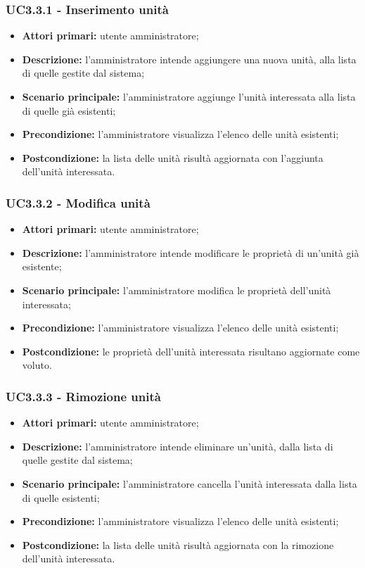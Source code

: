 \subsubsection{UC3.3.1 - Inserimento unità}
\begin{itemize}
	\item \textbf{Attori primari:} utente amministratore;
	\item \textbf{Descrizione:} l'amministratore intende aggiungere una nuova unità, alla lista di quelle gestite dal sistema;
	\item \textbf{Scenario principale:} l'amministratore aggiunge l'unità interessata alla lista di quelle già esistenti;
	\item \textbf{Precondizione:} l'amministratore visualizza l'elenco delle unità esistenti;
	\item \textbf{Postcondizione:} la lista delle unità risultà aggiornata con l'aggiunta dell'unità interessata.
\end{itemize}

\subsubsection{UC3.3.2 - Modifica unità}
\begin{itemize}
	\item \textbf{Attori primari:} utente amministratore;
	\item \textbf{Descrizione:} l'amministratore intende modificare le proprietà di un'unità già esistente;
	\item \textbf{Scenario principale:} l'amministratore modifica le proprietà dell'unità interessata;
	\item \textbf{Precondizione:} l'amministratore visualizza l'elenco delle unità esistenti;
	\item \textbf{Postcondizione:} le proprietà dell'unità interessata risultano aggiornate come voluto.
\end{itemize}

\subsubsection{UC3.3.3 - Rimozione unità}
\begin{itemize}
	\item \textbf{Attori primari:} utente amministratore;
	\item \textbf{Descrizione:} l'amministratore intende eliminare un'unità, dalla lista di quelle gestite dal sistema;
	\item \textbf{Scenario principale:} l'amministratore cancella l'unità interessata dalla lista di quelle esistenti;
	\item \textbf{Precondizione:} l'amministratore visualizza l'elenco delle unità esistenti;
	\item \textbf{Postcondizione:} la lista delle unità risultà aggiornata con la rimozione dell'unità interessata.
\end{itemize}

